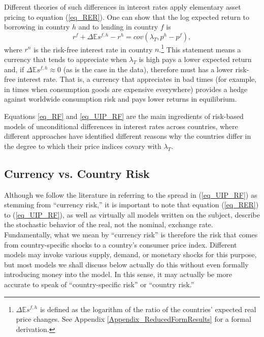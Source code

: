 \documentclass{ar-1col}
\begin{document}
Different theories of such differences in interest rates apply elementary asset pricing to equation (\ref{eq_RER}). One can show that the log expected return to borrowing in country $h$ and to lending in country $f$ is
\begin{equation}
  r^{f} + \Delta \mathbb{E} s^{f,h} - r^{h} 
  = cov\left( \lambda _{T},p^{h}-p^{f}\right),
  \label{eq_UIP_RF}
\end{equation}%
where $r^{n}$ is the risk-free interest rate in country $n$.\footnote{$\Delta\mathbb{E}s^{f,h}$ is defined as the logarithm of the ratio of the countries' expected real price changes. See Appendix \ref{Appendix_ReducedFormResults} for a formal derivation.} This statement means a currency that tends to appreciate when $\lambda_T$ is high pays a lower expected return and, if $\Delta \mathbb{E} s^{f,h}\approx0$ (as is the case in the data), therefore must has a lower risk-free interest rate. That is, a currency that appreciates in bad times (for example, in times when consumption goods are expensive everywhere) provides a hedge against worldwide consumption risk and pays lower returns in equilibrium.

Equations \eqref{eq_RF} and \eqref{eq_UIP_RF} are the main ingredients of risk-based models of unconditional differences in interest rates across countries, where different approaches have identified different reasons why the countries differ in the degree to which their price indices covary with $\lambda_T$.

\begin{textbox}[h]
\section{Currency vs. Country Risk}
Although we follow the literature in referring to the spread in (\ref{eq_UIP_RF}) as stemming from ``currency risk,'' it is important to note that equation (\ref{eq_RER}) to (\ref{eq_UIP_RF}), as well as virtually all models written on the subject, describe the stochastic behavior of the real, not the nominal, exchange rate. Fundamentally, what we mean by ``currency risk'' is therefore the risk that comes from country-specific shocks to a country's consumer price index. Different models may invoke various supply, demand, or monetary shocks for this purpose, but most models we shall discuss below actually do this without even formally introducing money into the model. In this sense, it may actually be more accurate to speak of ``country-specific risk'' or ``country risk.'' 
\end{textbox}
\end{document}
